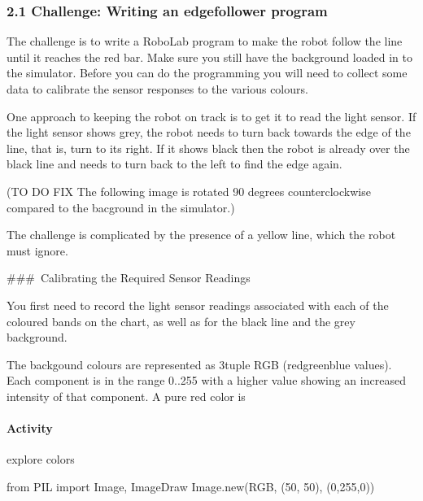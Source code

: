 \documentclass[letterpaper,10pt,english]{sphinxmanual}
\begin{document}
\subsubsection{2.1 Challenge: Writing an edge\sphinxhyphen{}follower program}
\label{\detokenize{content/04_Robot_Lab/Section_00_02:2.1-Challenge:-Writing-an-edge-follower-program}}
The challenge is to write a RoboLab program to make the robot follow the line until it reaches the red bar. Make sure you still have the  background loaded in to the simulator. Before you can do the programming you will need to collect some data to calibrate the sensor responses to the various colours.

One approach to keeping the robot on track is to get it to read the light sensor. If the light sensor shows grey, the robot needs to turn back towards the edge of the line, that is, turn to its right. If it shows black then the robot is already over the black line and needs to turn back to the left to find the edge again.

(TO DO \sphinxhyphen{} FIX \sphinxhyphen{} The following image is rotated 90 degrees counter\sphinxhyphen{}clockwise compared to the bacground in the simulator.)


The challenge is complicated by the presence of a yellow line, which the robot must ignore.

\#\#\# Calibrating the Required Sensor Readings

You first need to record the light sensor readings associated with each of the coloured bands on the chart, as well as for the black line and the grey background.

The backgound colours are represented as 3\sphinxhyphen{}tuple RGB (red\sphinxhyphen{}green\sphinxhyphen{}blue values). Each component is in the range 0..255 with a higher value showing an increased intensity of that component. A pure red color is


\paragraph{Activity}
\label{\detokenize{content/04_Robot_Lab/Section_00_02:Activity}}
explore colors

{
\begin{sphinxVerbatim}[commandchars=\\\{\}]
\llap{\color{nbsphinxin}[ ]:\,\hspace{\fboxrule}\hspace{\fboxsep}}from PIL import Image, ImageDraw
Image.new(\PYGZsq{}RGB\PYGZsq{}, (50, 50), (0,255,0))
\end{sphinxVerbatim}
}
\end{document}
